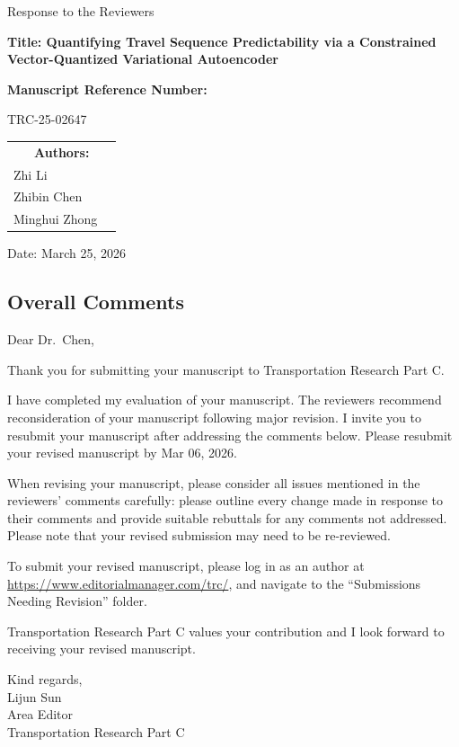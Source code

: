 \documentclass{NSF}
\begin{document}
\begin{titlepage}
\centering
{\LARGE Response to the Reviewers \par}
\vspace{1.5cm}

{\large \bfseries Title: Quantifying Travel Sequence Predictability via a Constrained Vector-Quantized Variational Autoencoder \par}
\vspace{1.5cm}

{\large \bfseries Manuscript Reference Number: \par
TRC-25-02647}
\vspace{1.5cm}

\begin{table}[h!]
\renewcommand{\arraystretch}{1}
\centering
\begin{tabular}{lc}
\multicolumn{2}{c}{\large \bfseries Authors:} \\
\large Zhi Li\\
\large Zhibin Chen\\
\large Minghui Zhong
\end{tabular}
\end{table}
\vspace{1.5cm}
\large Date: March 25, 2026
\end{titlepage}

\newpage
\newpage
\subsection{Overall Comments}
\begin{mdframed}

Dear Dr.\ Chen,

\vskip 0.1in
\noindent Thank you for submitting your manuscript to Transportation Research Part C.

\vskip 0.1in
\noindent I have completed my evaluation of your manuscript. The reviewers recommend reconsideration of your manuscript following major revision. I invite you to resubmit your manuscript after addressing the comments below. Please resubmit your revised manuscript by Mar 06, 2026.

\vskip 0.1in
\noindent When revising your manuscript, please consider all issues mentioned in the reviewers' comments carefully: please outline every change made in response to their comments and provide suitable rebuttals for any comments not addressed. Please note that your revised submission may need to be re-reviewed.

\vskip 0.1in
\noindent To submit your revised manuscript, please log in as an author at \url{https://www.editorialmanager.com/trc/}, and navigate to the ``Submissions Needing Revision'' folder.

\vskip 0.1in
\noindent Transportation Research Part C values your contribution and I look forward to receiving your revised manuscript.

\vskip 0.1in
\noindent Kind regards,\\
Lijun Sun \\
Area Editor\\
Transportation Research Part C

\end{mdframed}
\end{document}
